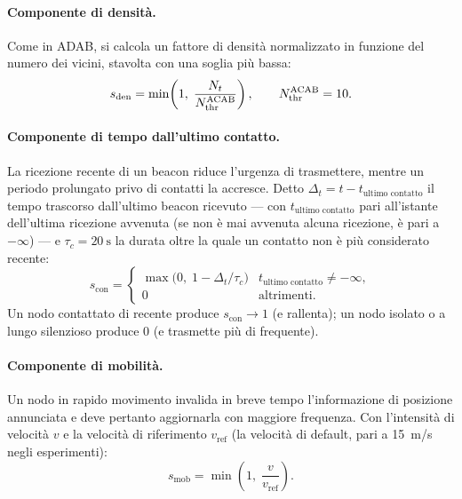 \paragraph{Componente di densit\`a.} Come in ADAB, si calcola un fattore di densit\`a normalizzato in funzione del numero dei vicini, stavolta con una soglia pi\`u bassa:
\begin{equation}
  s_{\mathrm{den}} = \min\!\left(1,\;\frac{N_t}{N_{\mathrm{thr}}^{\mathrm{ACAB}}}\right),
  \qquad N_{\mathrm{thr}}^{\mathrm{ACAB}} = 10 .
  \label{eq:acab-den}
\end{equation}

\paragraph{Componente di tempo dall'ultimo contatto.} La ricezione recente di un
beacon riduce l'urgenza di trasmettere, mentre un periodo prolungato privo di contatti
la accresce. Detto $\Delta_t = t - t_{\text{ultimo contatto}}$ il tempo trascorso
dall'ultimo beacon ricevuto --- con $t_{\text{ultimo contatto}}$ pari all'istante dell'ultima ricezione avvenuta (se non \`e mai avvenuta alcuna ricezione, \`e pari a $-\infty$) --- e $\tau_c = \SI{20}{\second}$ la durata oltre la
quale un contatto non \`e pi\`u considerato recente:
\begin{equation}
  s_{\mathrm{con}} =
  \begin{cases}
    \max\!\big(0,\; 1 - \Delta_t/\tau_c\big) & t_{\text{ultimo contatto}} \neq -\infty,\\
    0 & \text{altrimenti.}
  \end{cases}
  \label{eq:acab-con}
\end{equation}
Un nodo contattato di recente produce $s_{\mathrm{con}}\to 1$ (e rallenta); un
nodo isolato o a lungo silenzioso produce $0$ (e trasmette pi\`u di frequente).

\paragraph{Componente di mobilit\`a.} Un nodo in rapido movimento invalida in
breve tempo l'informazione di posizione annunciata e deve pertanto aggiornarla
con maggiore frequenza. Con l'intensit\`a di velocit\`a $v$ e la velocit\`a
di riferimento $v_{\text{ref}}$ (la velocit\`a di default, pari a
\SI{15}{m/s} negli esperimenti):
\begin{equation}
  s_{\mathrm{mob}} = \min\!\left(1,\;\frac{v}{v_{\text{ref}}}\right).
  \label{eq:acab-mob}
\end{equation}

